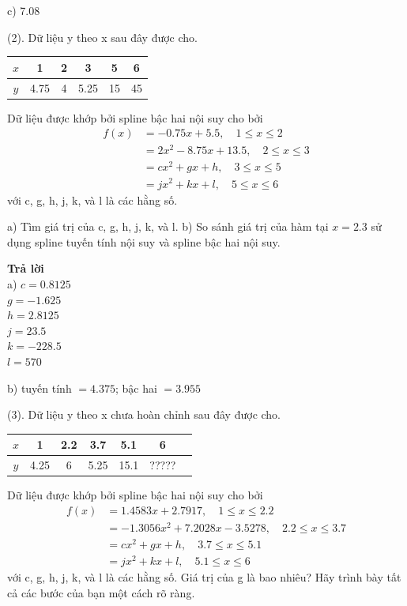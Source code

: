 c) 7.08

(2). Dữ liệu y theo x sau đây được cho.
\begin{table}[h]
\centering
\begin{tabular}{|c|c|c|c|c|c|}
\hline
$x$ & 1 & 2 & 3 & 5 & 6 \\
\hline
$y$ & 4.75 & 4 & 5.25 & 15 & 45 \\
\hline
\end{tabular}
\end{table}

Dữ liệu được khớp bởi spline bậc hai nội suy cho bởi
\begin{align}
f(x) &= -0.75x+5.5, \quad 1 \le x \le 2 \nonumber \\
&= 2x^2-8.75x+13.5, \quad 2 \le x \le 3 \nonumber \\
&= cx^2+gx+h, \quad 3 \le x \le 5 \nonumber \\
&= jx^2+kx+l, \quad 5 \le x \le 6
\end{align}
với c, g, h, j, k, và l là các hằng số.

a) Tìm giá trị của c, g, h, j, k, và l.
b) So sánh giá trị của hàm tại $x=2.3$ sử dụng spline tuyến tính nội suy và spline bậc hai nội suy.

\textbf{Trả lời} \\
a) $c=0.8125$ \\
$g=-1.625$ \\
$h=2.8125$ \\
$j=23.5$ \\
$k=-228.5$ \\
$l=570$

b) tuyến tính $= 4.375$; bậc hai $= 3.955$

(3). Dữ liệu y theo x chưa hoàn chỉnh sau đây được cho.
\begin{table}[h]
\centering
\begin{tabular}{|c|c|c|c|c|c|c|}
\hline
$x$ & 1 & 2.2 & 3.7 & 5.1 & 6 \\
\hline
$y$ & 4.25 & 6 & 5.25 & 15.1 & ????? \\
\hline
\end{tabular}
\end{table}

Dữ liệu được khớp bởi spline bậc hai nội suy cho bởi
\begin{align}
f(x) &= 1.4583x+2.7917, \quad 1 \le x \le 2.2 \nonumber \\
&= -1.3056x^2+7.2028x-3.5278, \quad 2.2 \le x \le 3.7 \nonumber \\
&= cx^2+gx+h, \quad 3.7 \le x \le 5.1 \nonumber \\
&= jx^2+kx+l, \quad 5.1 \le x \le 6
\end{align}
với c, g, h, j, k, và l là các hằng số. Giá trị của g là bao nhiêu? Hãy trình bày tất cả các bước của bạn một cách rõ ràng.

